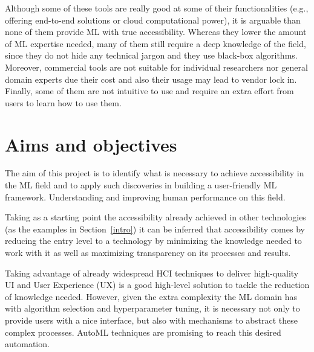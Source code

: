 \documentclass[runningheads]{llncs}
\begin{document}
Although some of these tools are really good at some of their functionalities (e.g., offering end-to-end solutions or cloud computational power), it is arguable than none of them provide ML with true accessibility. 
Whereas they lower the amount of ML expertise needed, many of them still require a deep knowledge of the field, since they do not hide any technical jargon and they use black-box algorithms. 
Moreover, commercial tools are not suitable for individual researchers nor general domain experts due their cost and also their usage may lead to vendor lock in. 
Finally, some of them are not intuitive to use and require an extra effort from users to learn how to use them.

\section{Aims and objectives}

The aim of this project is to identify what is necessary to achieve accessibility in the ML field and to apply such discoveries in building a user-friendly ML framework. 
Understanding and improving human performance on this field. 

Taking as a starting point the accessibility already achieved in other technologies (as the examples in Section~\ref{intro}) it can be inferred that accessibility comes by reducing the entry level to a technology by minimizing the knowledge needed to work with it as well as maximizing transparency on its processes and results. 

Taking advantage of already widespread HCI techniques to deliver high-quality UI and User Experience (UX) is a good high-level solution to tackle the reduction of knowledge needed.  However, given the extra complexity the ML domain has with algorithm selection and hyperparameter tuning, it is necessary not only to provide users with a nice interface, but also with mechanisms to abstract these complex processes. AutoML techniques are promising to reach this desired automation.
\end{document}
